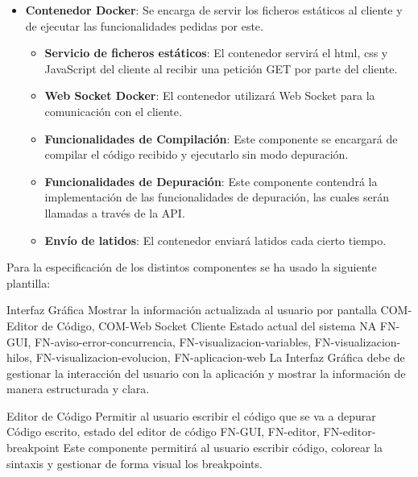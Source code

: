 \begin{itemize}
    \item \textbf{Contenedor Docker}: Se encarga de servir los ficheros estáticos al cliente y de ejecutar las funcionalidades pedidas por este.
    \begin{itemize}
        \item \textbf{Servicio de ficheros estáticos}: El contenedor servirá el html, css y JavaScript del cliente al recibir una petición GET por parte del cliente.
        \item \textbf{Web Socket Docker}: El contenedor utilizará Web Socket para la comunicación con el cliente.
        \item \textbf{Funcionalidades de Compilación}: Este componente se encargará de compilar el código recibido y ejecutarlo sin modo depuración.
        \item \textbf{Funcionalidades de Depuración}: Este componente contendrá la implementación de las funcionalidades de depuración, las cuales serán llamadas a través de la API.
        \item \textbf{Envío de latidos}: El contenedor enviará latidos cada cierto tiempo.
    \end{itemize}
\end{itemize}


Para la especificación de los distintos componentes se ha usado la siguiente plantilla: 

\printcomptemplate
\begin{component}{Interfaz Gráfica}
{Mostrar la información actualizada al usuario por pantalla}
{COM-Editor de Código, COM-Web Socket Cliente} %
{Estado actual del sistema} %
{NA} %
{FN-GUI, FN-aviso-error-concurrencia, FN-visualizacion-variables, FN-visualizacion-hilos, FN-visualizacion-evolucion, FN-aplicacion-web} %
La Interfaz Gráfica debe de gestionar la interacción del usuario con la aplicación y mostrar la información de manera estructurada y clara. %
\end{component}

\begin{component}{Editor de Código}
    {Permitir al usuario escribir el código que se va a depurar}
    {\NA} %
    {\NA} %
    {Código escrito, estado del editor de código} %
    {FN-GUI, FN-editor, FN-editor-breakpoint} %
    Este componente permitirá al usuario escribir código, colorear la sintaxis y gestionar de forma visual los breakpoints. %
\end{component}

